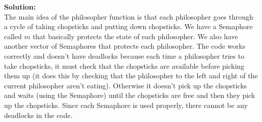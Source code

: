 \documentclass[12pt]{article}
\begin{document}
{\bf Solution:}\\

The main idea of the philosopher function is that each philosopher goes through a cycle of taking chopsticks and putting down chopsticks. We have a Semaphore called $m$ that basically protects the state of each philosopher. We also have another vector of Semaphores that protects each philosopher. The code works correctly and doesn't have deadlocks because each time a philosopher tries to take chopsticks, it must check that the chopsticks are available before picking them up (it does this by checking that the philosopher to the left and right of the current philosopher aren't eating). Otherwise it doesn't pick up the chopsticks and waits (using the Semaphore) until the chopsticks are free and then they pick up the chopsticks. Since each Semaphore is used properly, there cannot be any deadlocks in the code. 
\end{document}
